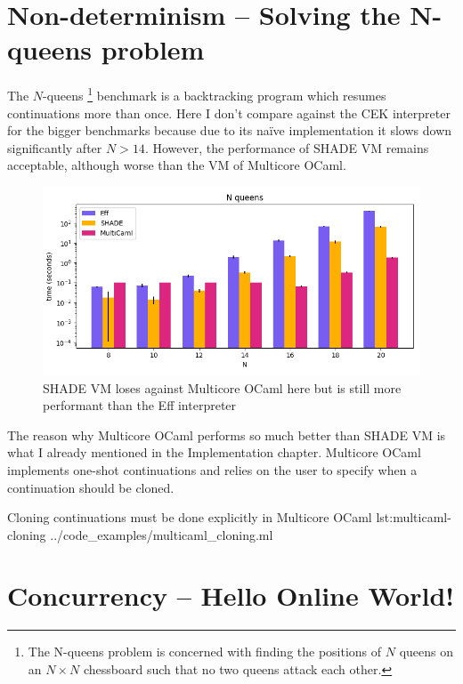 \documentclass[class=article, crop=false]{standalone}
\begin{document}
\section{Non-determinism -- Solving the N-queens problem}

The $N$-queens
\footnote{The N-queens problem is concerned with finding the positions of $N$
queens on an $N \times N$ chessboard such that no two queens attack each other.}
benchmark is a backtracking program which resumes continuations more than once.
Here I don't compare against the CEK interpreter for the bigger benchmarks
because due to its naïve implementation it slows down significantly after
$N > 14$. However, the performance of SHADE VM remains acceptable, although
worse than the VM of Multicore OCaml.

\begin{figure}
    \centering
    \includegraphics[width=35em]{eval_plots/comp_queens.png}
    \caption{SHADE VM loses against Multicore OCaml here but is still more
    performant than the Eff interpreter}
    \label{fig:n-queens}
\end{figure}

The reason why Multicore OCaml performs so much better than SHADE VM is what I
already mentioned in the Implementation chapter. Multicore OCaml implements
one-shot continuations and relies on the user to specify when a continuation
should be cloned.

{Cloning continuations must be done explicitly in Multicore OCaml}
{lst:multicaml-cloning}
{../code_examples/multicaml_cloning.ml}

\section{Concurrency -- Hello Online World!}
\end{document}
